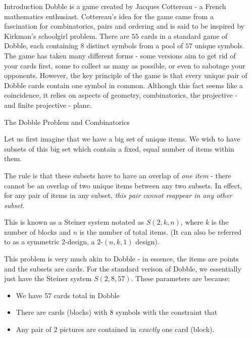 \documentclass[final]{beamer}
\newlength{\sepwidth}
\newlength{\colwidth}
\newcommand{\separatorcolumn}{\begin{column}{\sepwidth}\end{column}}
\begin{document}
\begin{frame}[t]
\begin{columns}[t]
\separatorcolumn

\begin{column}{\colwidth}

  \begin{block}{Introduction}
    Dobble is a game created by Jacques Cottereau - a French mathematics enthusiast. Cottereau’s idea for the game came from a fascination for combinatorics, pairs and ordering and is said to be inspired by Kirkman’s schoolgirl problem. There are $55$ cards in a standard game of Dobble, each containing $8$ distinct symbols from a pool of $57$ unique symbols. The game has taken many different forms - some versions aim to get rid of your cards first, some to collect as many as possible, or even to sabotage your opponents. However, the key principle of the game is that every unique pair of Dobble cards contain one symbol in common. Although this fact seems like a coincidence, it relies on aspects of geometry, combinatorics, the projective - and finite projective - plane. 
  \end{block}

  \begin{block}{The Dobble Problem and Combinatorics}

    Let us first imagine that we have a big set of unique items. We wish to have subsets of this big set which contain a fixed, equal number of items within them.
    
    The rule is that these subsets have to have an overlap of \emph{one item} - there cannot be an overlap of two unique items between any two subsets. In effect, for any pair of items in any subset, \emph{this pair cannot reappear in any other subset}.

    This is known as a Steiner system notated as $S(2,k,n)$, where $k$ is the number of blocks and $n$ is the number of total items. (It can also be referred to as a symmetric $2$-design, a $2$-$(n,k,1)$ design).

This problem is very much akin to Dobble - in essence, the items are points and the subsets are cards. For the standard verison of Dobble, we essentially just have the Steiner system $S(2,8,57)$.
These parameters are because:
\begin{itemize}
    \item We have 57 cards total in Dobble
    \item There are cards (blocks) with $8$ symbols with the constraint that
    \item Any pair of $2$ pictures are contained in \emph{exactly} one card (block).
\end{itemize}


\end{block}
\end{column}
\end{columns}
\end{frame}
\end{document}
